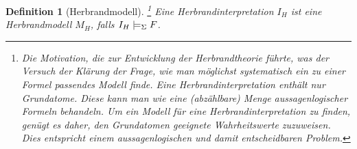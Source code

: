 \documentclass[a4paper, 11pt]{book}
\newtheorem{Def}{Definition }[section]
\begin{document}
\begin{Def}[Herbrandmodell] 
\footnote{Die Motivation, die zur Entwicklung der Herbrandtheorie führte, was der Versuch der Klärung der Frage, wie man möglichst systematisch ein zu einer Formel passendes Modell finde. Eine Herbrandinterpretation enthält nur Grundatome. Diese kann man wie eine (abzählbare) Menge aussagenlogischer Formeln behandeln. Um ein Modell für eine Herbrandinterpretation zu finden, genügt es daher, den Grundatomen geeignete Wahrheitswerte zuzuweisen. Dies entspricht einem aussagenlogischen und damit entscheidbaren Problem.}
Eine Herbrandinterpretation $ I_H $ ist eine Herbrandmodell $ M_H $, falls $ I_H \models_{\footnotesize{\Sigma}} F $.
\end{Def}
\end{document}
